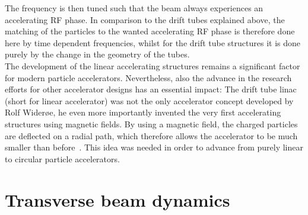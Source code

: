 The frequency is then tuned such that the beam always experiences an accelerating RF phase.
In comparison to the drift tubes explained above, the matching of the particles to the wanted accelerating RF phase is therefore done here by time dependent frequencies, whilst for the drift tube structures it is done purely by the change in the geometry of the tubes.
\\
The development of the linear accelerating structures remains a significant factor for modern particle accelerators.
Nevertheless, also the advance in the research efforts for other accelerator designs has an essential impact:
The drift tube linac (short for linear accelerator) was not the only accelerator concept developed by Rolf Wider\o e, he even more importantly invented the very first accelerating structures using magnetic fields.
By using a magnetic field, the charged particles are deflected on a radial path, which therefore allows the accelerator to be much smaller than before~\cite[cf. p. 8]{Wilson}.
This idea was needed in order to advance from purely linear to circular particle accelerators.


\section{Transverse beam dynamics}
\label{AccPhysics:Magnets}

